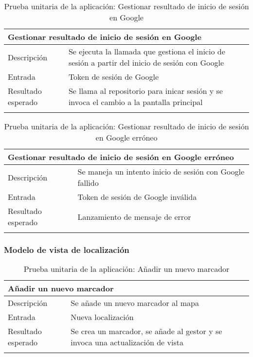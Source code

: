 \begin{longtable}{|p{} p{}|}
    \hline
    \multicolumn{2}{|l|}{\textbf{Gestionar resultado de inicio de sesión en Google}} \\ \hline 
    Descripción                 & Se ejecuta la llamada que gestiona el inicio de sesión a partir del inicio de sesión con Google  \\ \hline
    Entrada                     & Token de sesión de Google \\ \hline
    Resultado esperado          & Se llama al repositorio para inicar sesión y se invoca el cambio a la pantalla principal \\ \hline
    \caption{Prueba unitaria de la aplicación: Gestionar resultado de inicio de sesión en Google}
    \label{cp:u:app:gestionar_resultado_inicio_google}
\end{longtable}

\vspace{-10pt}
\begin{longtable}{|p{} p{}|}
    \hline
    \multicolumn{2}{|l|}{\textbf{Gestionar resultado de inicio de sesión en Google erróneo}} \\ \hline 
    Descripción                 & Se maneja un intento inicio de sesión con Google fallido \\ \hline
    Entrada                     & Token de sesión de Google inválida \\ \hline
    Resultado esperado          & Lanzamiento de mensaje de error \\ \hline
    \caption{Prueba unitaria de la aplicación: Gestionar resultado de inicio de sesión en Google erróneo}
    \label{cp:u:app:gestionar_resultado_inicio_google_erroneo}
\end{longtable}
    
\vspace{-10pt}
\subsubsection{Modelo de vista de localización}

\begin{longtable}{|p{} p{}|}
    \hline
    \multicolumn{2}{|l|}{\textbf{Añadir un nuevo marcador}} \\ \hline 
    Descripción                 & Se añade un nuevo marcador al mapa \\ \hline
    Entrada                     & Nueva localización \\ \hline
    Resultado esperado          & Se crea un marcador, se añade al gestor y se invoca una actualización de vista \\ \hline
    \caption{Prueba unitaria de la aplicación: Añadir un nuevo marcador}
    \label{cp:u:app:añadir_nuevo_marcador_vista}
\end{longtable}

